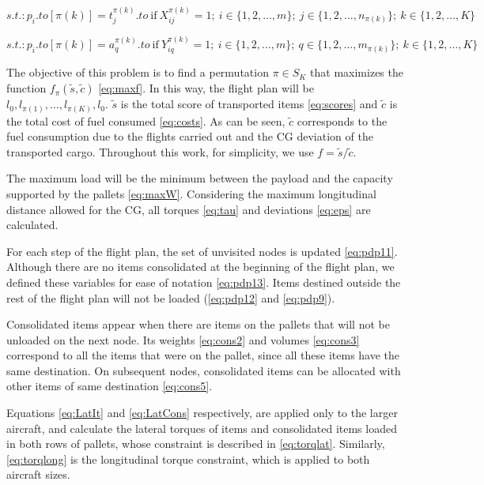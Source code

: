 \documentclass[preprint,authoryear]{elsarticle}
\begin{document}
\begin{equation} \label{eq:pdp8}
	s.t.: p_i.to[{\pi(k)}] = t^{\pi(k)}_j.to\ \mbox{if} \ X_{ij}^{\pi(k)} = 1; \ i \in \{1, 2, \ldots, m\}; \ j \in \{1, 2, \ldots, n_{\pi(k)}\}; \ k \in \{1, 2, \ldots, K\}
\end{equation}

\begin{equation} \label{eq:pdp2}
	s.t.:  p_i.to[{\pi(k)}] = a^{\pi(k)}_q.to\ \mbox{if} \ Y_{iq}^{\pi(k)} = 1; \ i \in \{1, 2, \ldots, m\};\ q \in \{1, 2, \ldots, m_{\pi(k)}\}; \ k \in \{1, 2, \ldots, K\}
\end{equation}


The objective of this problem is to find a permutation $\pi \in S_K$\/ that maximizes the function $f_\pi(\tilde{s},\tilde{c})$ \ref{eq:maxf}. In this way, the flight plan will be $l_0, l_{\pi(1)}, \ldots, l_{\pi(K)}, l_0$. $\tilde{s}$\/ is the total score of transported items \ref{eq:scores} and  $\tilde{c}$\/ is the total cost of fuel consumed \ref{eq:costs}. As can be seen, $\tilde{c}$\/ corresponds to the fuel consumption due to the flights carried out and the CG deviation of the transported cargo. Throughout this work, for simplicity, we use $f=\tilde{s}/\tilde{c}$.

The maximum load will be the minimum between the payload and the capacity supported by the pallets \ref{eq:maxW}. Considering the maximum longitudinal distance allowed for the CG, all torques \ref{eq:tau} and deviations \ref{eq:eps} are calculated.

For each step of the flight plan, the set of unvisited nodes is updated \ref{eq:pdp11}. Although there are no items consolidated at the beginning of the flight plan, we defined these variables for ease of notation \ref{eq:pdp13}. Items destined outside the rest of the flight plan will not be loaded (\ref{eq:pdp12} and \ref{eq:pdp9}).

Consolidated items appear when there are items on the pallets that will not be unloaded on the next node. Its weights \ref{eq:cons2} and volumes \ref{eq:cons3} correspond to all the items that were on the pallet, since all these items have the same destination. On subsequent nodes, consolidated items can be allocated with other items of same destination \ref{eq:cons5}.

Equations \ref{eq:LatIt} and \ref{eq:LatCons} respectively, are applied only to the larger aircraft, and calculate the lateral torques of items and consolidated items loaded in both rows of pallets, whose constraint is described in \ref{eq:torqlat}. Similarly, \ref{eq:torqlong} is the longitudinal torque constraint, which is applied to both aircraft sizes.
\end{document}
